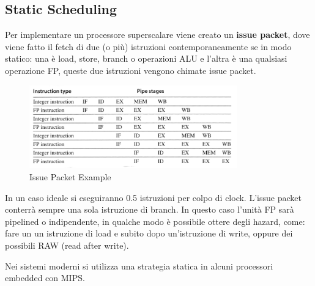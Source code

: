 \documentclass[12pt]{article}
\begin{document}
\subsection{Static Scheduling}
Per implementare un processore superscalare viene creato un \textbf{issue packet}, dove viene fatto il fetch di due (o pi\`u) istruzioni contemporaneamente se in modo statico: una \`e load, store, branch o operazioni ALU e l'altra \`e una qualsiasi operazione FP, queste due istruzioni vengono chimate issue packet.
\begin{figure}[H]
    \centering
    \includegraphics[width=0.8\textwidth]{issue-packet-example.png}
    \caption{Issue Packet Example}
    \label{fig:issue-packet-example}
\end{figure}
In un caso ideale si eseguiranno 0.5 istruzioni per colpo di clock. L'issue packet conterr\`a sempre una sola istruzione di branch. In questo caso l'unit\`a FP sar\`a pipelined o indipendente, in qualche modo \`e possibile ottere degli hazard, come: fare un un istruzione di load e subito dopo un'istruzione di write, oppure dei possibili RAW (read after write).

Nei sistemi moderni si utilizza una strategia statica in alcuni processori embedded con MIPS.
\end{document}
